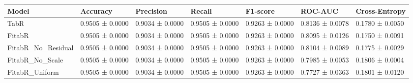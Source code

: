 \begin{tabular}{lllllll}
\toprule
Model & Accuracy & Precision & Recall & F1-score & ROC-AUC & Cross-Entropy \\
\midrule
TabR & 0.9505 ± 0.0000 & 0.9034 ± 0.0000 & 0.9505 ± 0.0000 & 0.9263 ± 0.0000 & 0.8136 ± 0.0078 & 0.1780 ± 0.0050 \\
FitabR & 0.9505 ± 0.0000 & 0.9034 ± 0.0000 & 0.9505 ± 0.0000 & 0.9263 ± 0.0000 & 0.8095 ± 0.0126 & 0.1750 ± 0.0091 \\
FitabR_No_Residual & 0.9505 ± 0.0000 & 0.9034 ± 0.0000 & 0.9505 ± 0.0000 & 0.9263 ± 0.0000 & 0.8104 ± 0.0089 & 0.1775 ± 0.0029 \\
FitabR_No_Scale & 0.9505 ± 0.0000 & 0.9034 ± 0.0000 & 0.9505 ± 0.0000 & 0.9263 ± 0.0000 & 0.7985 ± 0.0053 & 0.1806 ± 0.0004 \\
FitabR_Uniform & 0.9505 ± 0.0000 & 0.9034 ± 0.0000 & 0.9505 ± 0.0000 & 0.9263 ± 0.0000 & 0.7727 ± 0.0363 & 0.1801 ± 0.0120 \\
\bottomrule
\end{tabular}
